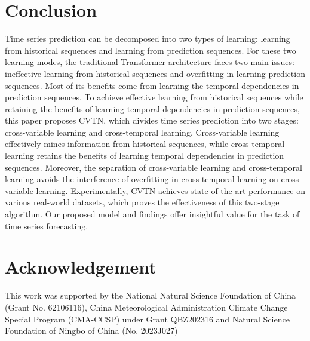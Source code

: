 \section{Conclusion}
Time series prediction can be decomposed into two types of learning: learning from historical sequences and learning from prediction sequences. For these two learning modes, the traditional Transformer architecture faces two main issues: ineffective learning from historical sequences and overfitting in learning prediction sequences. Most of its benefits come from learning the temporal dependencies in prediction sequences. To achieve effective learning from historical sequences while retaining the benefits of learning temporal dependencies in prediction sequences, this paper proposes CVTN, which divides time series prediction into two stages: cross-variable learning and cross-temporal learning. Cross-variable learning effectively mines information from historical sequences, while cross-temporal learning retains the benefits of learning temporal dependencies in prediction sequences. Moreover, the separation of cross-variable learning and cross-temporal learning avoids the interference of overfitting in cross-temporal learning on cross-variable learning. Experimentally, CVTN achieves state-of-the-art performance on various real-world datasets, which proves the effectiveness of this two-stage algorithm. Our proposed model and findings offer insightful value for the task of time series forecasting.

\section*{Acknowledgement}
This work was supported by the National Natural Science Foundation of China (Grant No. 62106116), China Meteorological Administration Climate Change Special Program (CMA-CCSP) under Grant QBZ202316 and Natural Science
Foundation of Ningbo of China (No. 2023J027)

\small




